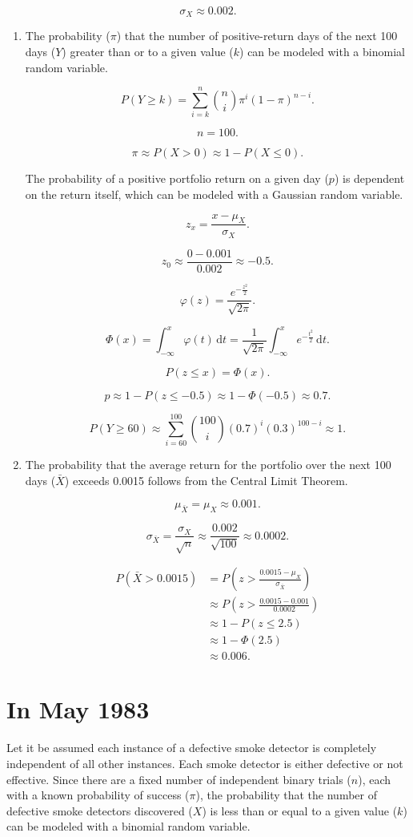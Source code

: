 \documentclass[12pt]{article}
\begin{document}
\[\sigma_X\approx 0.002.\]
\begin{enumerate}
\item The probability ($\pi$) that the number of positive-return days of the next 100 days ($Y$) greater than or to a given value ($k$) can be modeled with a binomial random variable.

\[P(Y\geq k)=\sum^{n}_{i=k}{{\binom{n}{i}}\pi^i(1-\pi)^{n-i}}.\]

\[n=100.\]

\[\pi\approx P(X>0)\approx 1-P(X\leq 0).\]

The probability of a positive portfolio return on a given day ($p$) is dependent on the return itself, which can be modeled with a Gaussian random variable.

\[z_x=\frac{x-\mu_X}{\sigma_X}.\]

\[z_0\approx\frac{0-0.001}{0.002}\approx -0.5.\]

\[\varphi(z)=\frac{e^{-\frac{z^2}{2}}}{\sqrt{2\pi}}.\]

\[\Phi(x)=\int^x_{-\infty}{\varphi(t)\,\mathrm{d}t}=\frac{1}{\sqrt{2\pi}}\int^x_{-\infty}{e^{-\frac{t^2}{2}}\,\mathrm{d}t}.\]

\[P(z\leq x)=\Phi(x).\]

\[p\approx 1-P(z\leq -0.5)\approx 1-\Phi(-0.5)\approx 0.7.\]

\[P(Y\geq 60)\approx\sum^{100}_{i=60}{{\binom{100}{i}}(0.7)^i(0.3)^{100-i}}\approx1.\]

\item The probability that the average return for the portfolio over the next 100 days ($\bar{X}$) exceeds 0.0015 follows from the Central Limit Theorem.

\[\mu_{\bar{X}}=\mu_X\approx 0.001.\]

\[\sigma_{\bar{X}}=\frac{\sigma_X}{\sqrt{n}}\approx\frac{0.002}{\sqrt{100}}\approx 0.0002.\]

\begin{align*}
P(\bar{X}>0.0015)
&=P\left(z>\frac{0.0015-\mu_X}{\sigma_{\bar{X}}}\right)\\
&\approx P\left(z>\frac{0.0015-0.001}{0.0002}\right)\\
&\approx 1-P(z\leq 2.5)\\
&\approx 1-\Phi(2.5)\\
&\approx 0.006.
\end{align*}
\end{enumerate}
\section{In May 1983}
Let it be assumed each instance of a defective smoke detector is completely independent of all other instances. Each smoke detector is either defective or not effective. Since there are a fixed number of independent binary trials ($n$), each with a known probability of success ($\pi$), the probability that the number of defective smoke detectors discovered ($X$) is less than or equal to a given value ($k$) can be modeled with a binomial random variable.
\end{document}
